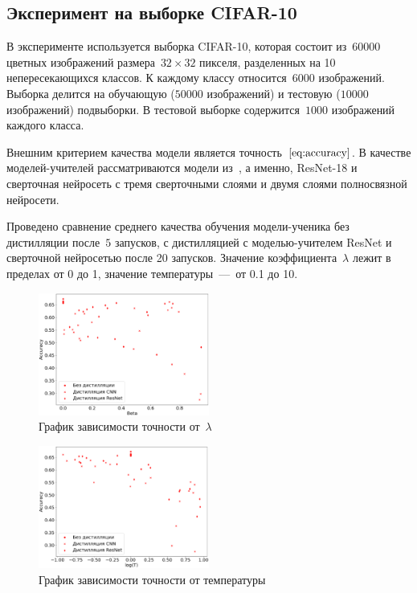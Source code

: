 \documentclass[12pt, twoside]{article}
\begin{document}
\subsection{Эксперимент на выборке CIFAR-10}
В эксперименте используется выборка CIFAR-10, которая состоит из~$60000$ цветных изображений размера~$32 \times 32$ пикселя, разделенных на 10 непересекающихся классов. К каждому классу относится~$6000$ изображений. Выборка делится на обучающую ($50000$ изображений) и тестовую ($10000$ изображений) подвыборки. В тестовой выборке содержится~$1000$ изображений каждого класса.

Внешним критерием качества модели является точность~$\eqref{eq:accuracy}$. В качестве моделей-учителей рассматриваются модели из~\cite{conf/cvpr/PassalisTT20}, а именно, ResNet-18 и сверточная нейросеть с тремя сверточными слоями и двумя слоями полносвязной нейросети.

Проведено сравнение среднего качества обучения модели-ученика без дистилляции после~$5$ запусков, с дистилляцией с моделью-учителем ResNet и сверточной нейросетью после 20 запусков. Значение коэффициента~$\lambda$ лежит в пределах от 0 до 1, значение температуры~---~от 0.1 до 10.

\begin{figure}[!ht]
\centering
\includegraphics[width=0.5\textwidth]{scatter_beta_acc.eps}
\caption{График зависимости точности от~$\lambda$}
\label{fig:beta_acc}
\end{figure}

\begin{figure}[!ht]
\centering
\includegraphics[width=0.5\textwidth]{scatter_temp_acc.eps}
\caption{График зависимости точности от температуры}
\label{fig:temp_acc}
\end{figure}
\end{document}
